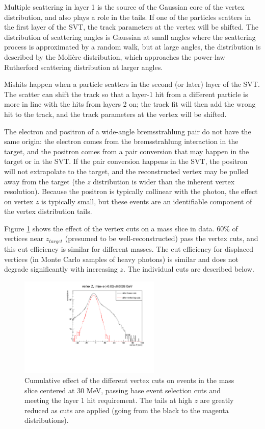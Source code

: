 Multiple scattering in layer 1 is the source of the Gaussian core of the vertex distribution, and also plays a role in the tails.
If one of the particles scatters in the first layer of the SVT, the track parameters at the vertex will be shifted.
The distribution of scattering angles is Gaussian at small angles where the scattering process is approximated by a random walk, but at large angles, the distribution is described by the Moli\`ere distribution, which approaches the power-law Rutherford scattering distribution at larger angles.

Mishits happen when a particle scatters in the second (or later) layer of the SVT.
The scatter can shift the track so that a layer-1 hit from a different particle is more in line with the hits from layers 2 on; the track fit will then add the wrong hit to the track, and the track parameters at the vertex will be shifted.

The electron and positron of a wide-angle bremsstrahlung pair do not have the same origin: the electron comes from the bremsstrahlung interaction in the target, and the positron comes from a pair conversion that may happen in the target or in the SVT.
If the pair conversion happens in the SVT, the positron will not extrapolate to the target, and the reconstructed vertex may be pulled away from the target (the $z$ distribution is wider than the inherent vertex resolution).
Because the positron is typically collinear with the photon, the effect on vertex $z$ is typically small, but these events are an identifiable component of the vertex distribution tails.

Figure \ref{fig:vertcut_performance} shows the effect of the vertex cuts on a mass slice in data. 60\% of vertices near $z_{target}$ (presumed to be well-reconstructed) pass the vertex cuts, and this cut efficiency is similar for different masses.
The cut efficiency for displaced vertices (in Monte Carlo samples of heavy photons) is similar and does not degrade significantly with increasing $z$.
The individual cuts are described below.

\begin{figure}[ht]
\begin{center}
    \includegraphics[width=0.6\textwidth,page=2,angle=-90]{vertexing/figs/vertcutplots}
\end{center}
    \caption{Cumulative effect of the different vertex cuts on events in the mass slice centered at 30 MeV, passing base event selection cuts and meeting the layer 1 hit requirement.
    The tails at high $z$ are greatly reduced as cuts are applied (going from the black to the magenta distributions).
    }
    \label{fig:vertcut_performance}
\end{figure}

